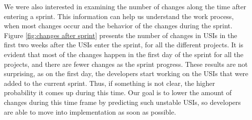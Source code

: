 

We were also interested in examining the number of changes along the time after entering a sprint. This information can help us understand the work process, when most changes occur and the behavior of the changes during the sprint. Figure \ref{fig:changes after sprint} presents the number of changes in USIs in the first two weeks after the USIs enter the sprint, for all the different projects. It is evident that most of the changes happen in the first day of the sprint for all the projects, and there are fewer changes as the sprint progress. These results are not surprising, as on the first day, the developers start working on the USIs that were added to the current sprint. Thus, if something is not clear, the higher probability it comes up during this time. Our goal is to lower the amount of changes during this time frame by predicting such unstable USIs, so developers are able to move into implementation as soon as possible. 

